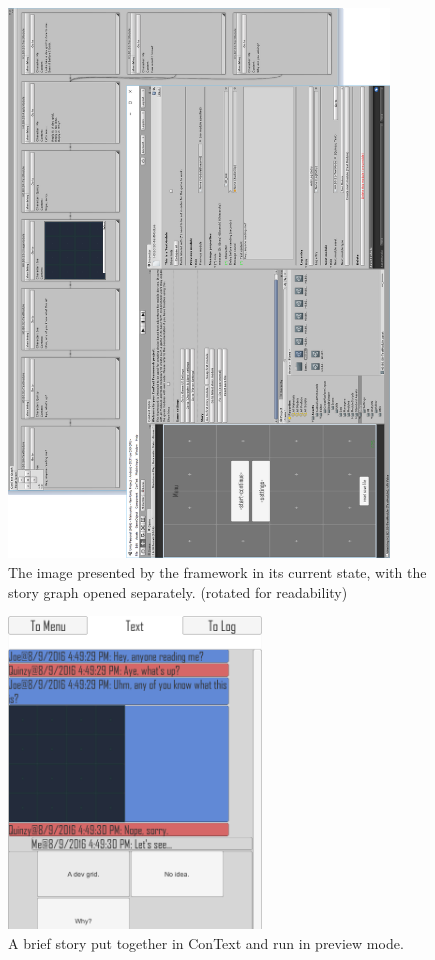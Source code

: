 \begin{figure}[H]
\centering
\includegraphics[width=0.9\textwidth]{figures/inengineSample_rot.png}
\caption[Inengine view and layout]{The image presented by the framework in its current state, with the story graph opened separately. (rotated for readability)}\label{fig:editor}
\end{figure}
\begin{figure}[H]
\centering
\includegraphics[width=0.6\textwidth]{figures/inengineStory.png}
\caption[Inengine story sample]{A brief story put together in ConText and run in preview mode.}\label{fig:inengineStory}
\end{figure}

